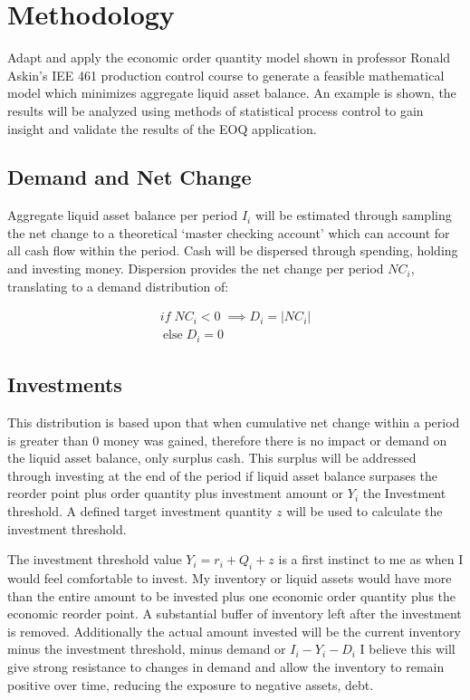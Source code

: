 \documentclass{article}
\begin{document}
\section{Methodology}
Adapt and apply the economic order quantity model shown in professor Ronald Askin’s IEE 461 \cite{Askin2019} production control course to generate a feasible mathematical model which minimizes aggregate liquid asset balance. An example is shown, the results will be analyzed using methods of statistical process control to gain insight and validate the results of the EOQ application. 

\subsection{Demand and Net Change}
Aggregate liquid asset balance per period  $I_{i}$ will be estimated through sampling the net change to a theoretical ‘master checking account’ which can account for all cash flow within the period. Cash will be dispersed through spending, holding and investing money. Dispersion provides the net change per period $NC_{i}$, translating to a demand distribution of:

\begin{equation}
	\begin{split}
		if \; NC_{i} < 0 \;\implies D_{i} = |NC_{i}| \\
	  	\:\text{else}\; D_{i} = 0
	\end{split}
\end{equation}

\subsection{Investments}
This distribution is based upon that when cumulative net change within a period is greater than 0 money was gained, therefore there is no impact or demand on the liquid asset balance, only surplus cash. This surplus will be addressed through investing at the end of the period if liquid asset balance surpases the reorder point plus order quantity plus investment amount or $Y_{i}$ the Investment threshold. A defined target investment quantity $z$ will be used to calculate the investment threshold. 

The investment threshold value  $Y_{i} =  r_{i} + Q_{i} + z$  is a first instinct to me as when I would feel comfortable to invest. My inventory or liquid assets would have more than the entire amount to be invested plus one economic order quantity plus the economic reorder point. A substantial buffer of inventory left after the investment is removed. Additionally the actual amount invested will be the current inventory minus the investment threshold, minus demand or $I_{i} - Y_{i} - D_{i}$  I believe this will give strong resistance to changes in demand and allow the inventory to remain positive over time, reducing the exposure to negative assets, debt. 
\end{document}
